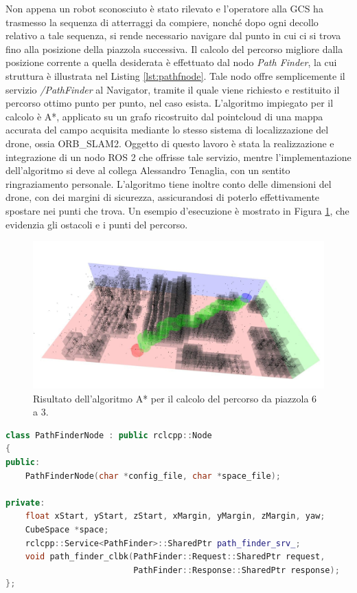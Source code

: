 \indent Non appena un robot sconosciuto è stato rilevato e l'operatore alla GCS ha trasmesso la sequenza di atterraggi da compiere, nonché dopo ogni decollo relativo a tale sequenza, si rende necessario navigare dal punto in cui ci si trova fino alla posizione della piazzola successiva. Il calcolo del percorso migliore dalla posizione corrente a quella desiderata è effettuato dal nodo \emph{Path Finder}, la cui struttura è illustrata nel Listing \ref{lst:pathfnode}. Tale nodo offre semplicemente il servizio \emph{/PathFinder} al Navigator, tramite il quale viene richiesto e restituito il percorso ottimo punto per punto, nel caso esista. L'algoritmo impiegato per il calcolo è A*, applicato su un grafo ricostruito dal pointcloud di una mappa accurata del campo acquisita mediante lo stesso sistema di localizzazione del drone, ossia ORB\_SLAM2. Oggetto di questo lavoro è stata la realizzazione e integrazione di un nodo ROS 2 che offrisse tale servizio, mentre l'implementazione dell'algoritmo si deve al collega Alessandro Tenaglia, con un sentito ringraziamento personale. L'algoritmo tiene inoltre conto delle dimensioni del drone, con dei margini di sicurezza, assicurandosi di poterlo effettivamente spostare nei punti che trova. Un esempio d'esecuzione è mostrato in Figura \ref{fig:pathfpath}, che evidenzia gli ostacoli e i punti del percorso.

\begin{figure}
    \centering
    \includegraphics[width=\textwidth]{figs/chapter3/pathfpath.jpg}
    \caption{Risultato dell'algoritmo A* per il calcolo del percorso da piazzola 6 a 3.}
    \label{fig:pathfpath}
\end{figure}

\vspace{0.5cm}
\begin{lstlisting}[language=C++, caption={Definizione del nodo \emph{path\_finder}.}, label={lst:pathfnode}]
class PathFinderNode : public rclcpp::Node
{
public:
    PathFinderNode(char *config_file, char *space_file);

private:
    float xStart, yStart, zStart, xMargin, yMargin, zMargin, yaw;
    CubeSpace *space;
    rclcpp::Service<PathFinder>::SharedPtr path_finder_srv_;
    void path_finder_clbk(PathFinder::Request::SharedPtr request,
                          PathFinder::Response::SharedPtr response);
};
\end{lstlisting}

